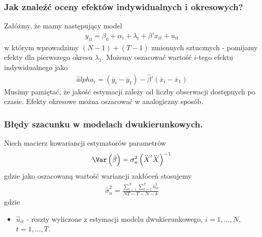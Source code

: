 \subsubsection{Jak znaleźć oceny efektów indywidualnych i okresowych?}
Załóżmy, że mamy następujący model
\begin{gather*}
y_{it}=\beta_0+\alpha_i+\lambda_t+\beta'x_{it}+u_{it}
\end{gather*}
w którym wprowadzimy $ (N-1)+(T-1) $ zmiennych sztucznych - pomijamy efekty dla pierwszego okresu $ \lambda_1 $. Możemy oszacować wartość $ i $-tego efektu indywidualnego jako
\begin{gather*}
\hat alpha _i=(\overline y_i-\overline y_1)-\hat \beta' (\overline x_i-\overline x _1)
\end{gather*}
Musimy pamiętać, że jakość estymacji zależy od liczby obserwacji dostępnych po czasie. Efekty okresowe można oszacować w analogiczny sposób.
\subsubsection{Błędy szacunku w modelach dwukierunkowych.}
Niech macierz kowariancji estymatorów parametrów
\begin{gather*}
\Var\left(\hat \beta \right)=\sigma _u^2\left(\dddot X'\dddot X\right)^{-1}
\end{gather*}
gdzie jako oszacowaną wartość wariancji zakłóceń stosujemy
\begin{gather*}
\hat \sigma _n^2=
\frac{\sum\limits_{i=1}^{N}\sum\limits_{t=1}^{T}\hat u_{it}^2}{NT-T-N-k}
\end{gather*}
gdzie
\begin{itemize}
\item $ \hat u_{it} $ - reszty wyliczone z estymacji modelu dwukierunkowego, $ i=1,\dots ,N$, $t=1,\dots,T $.
\end{itemize}
